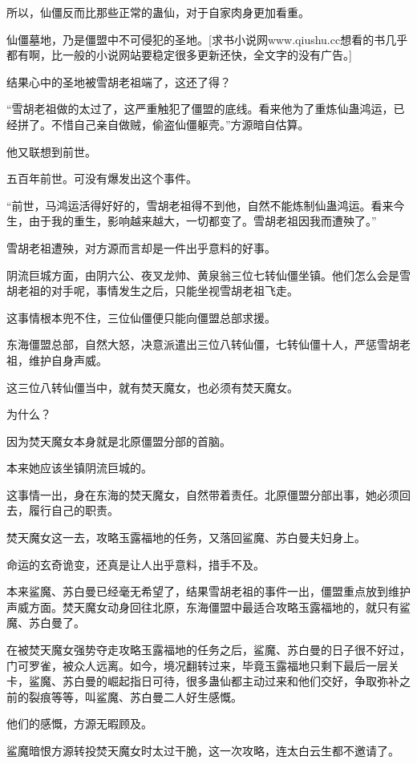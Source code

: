 \begin{this_body}
所以，仙僵反而比那些正常的蛊仙，对于自家肉身更加看重。

仙僵墓地，乃是僵盟中不可侵犯的圣地。[求书小说网www.qiushu.cc想看的书几乎都有啊，比一般的小说网站要稳定很多更新还快，全文字的没有广告。]

结果心中的圣地被雪胡老祖端了，这还了得？

“雪胡老祖做的太过了，这严重触犯了僵盟的底线。看来他为了重炼仙蛊鸿运，已经拼了。不惜自己亲自做贼，偷盗仙僵躯壳。”方源暗自估算。

他又联想到前世。

五百年前世。可没有爆发出这个事件。

“前世，马鸿运活得好好的，雪胡老祖得不到他，自然不能炼制仙蛊鸿运。看来今生，由于我的重生，影响越来越大，一切都变了。雪胡老祖因我而遭殃了。”

雪胡老祖遭殃，对方源而言却是一件出乎意料的好事。

阴流巨城方面，由阴六公、夜叉龙帅、黄泉翁三位七转仙僵坐镇。他们怎么会是雪胡老祖的对手呢，事情发生之后，只能坐视雪胡老祖飞走。

这事情根本兜不住，三位仙僵便只能向僵盟总部求援。

东海僵盟总部，自然大怒，决意派遣出三位八转仙僵，七转仙僵十人，严惩雪胡老祖，维护自身声威。

这三位八转仙僵当中，就有焚天魔女，也必须有焚天魔女。

为什么？

因为焚天魔女本身就是北原僵盟分部的首脑。

本来她应该坐镇阴流巨城的。

这事情一出，身在东海的焚天魔女，自然带着责任。北原僵盟分部出事，她必须回去，履行自己的职责。

焚天魔女这一去，攻略玉露福地的任务，又落回鲨魔、苏白曼夫妇身上。

命运的玄奇诡变，还真是让人出乎意料，措手不及。

本来鲨魔、苏白曼已经毫无希望了，结果雪胡老祖的事件一出，僵盟重点放到维护声威方面。焚天魔女动身回往北原，东海僵盟中最适合攻略玉露福地的，就只有鲨魔、苏白曼了。

在被焚天魔女强势夺走攻略玉露福地的任务之后，鲨魔、苏白曼的日子很不好过，门可罗雀，被众人远离。如今，境况翻转过来，毕竟玉露福地只剩下最后一层关卡，鲨魔、苏白曼的崛起指日可待，很多蛊仙都主动过来和他们交好，争取弥补之前的裂痕等等，叫鲨魔、苏白曼二人好生感慨。

他们的感慨，方源无暇顾及。

鲨魔暗恨方源转投焚天魔女时太过干脆，这一次攻略，连太白云生都不邀请了。


\end{this_body}
